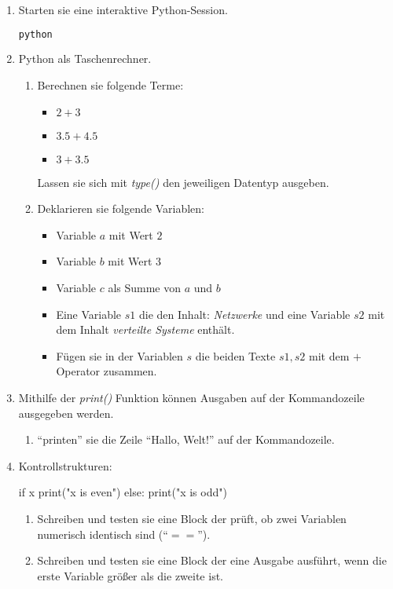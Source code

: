 \documentclass[paper=a4,fontsize=11pt]{scrartcl}%
\numberwithin{equation}{section}
\begin{document}
\begin{enumerate}
	\item Starten sie eine interaktive Python-Session.
	\begin{lstlisting}[style=Bash, language=Bash]
python
\end{lstlisting}
	\item Python als Taschenrechner.
	\begin{enumerate}
	\item Berechnen sie folgende Terme:
		\begin{itemize}
			\item $2 + 3$
			\item $3.5 + 4.5$
			\item $3 + 3.5$
		\end{itemize}
		Lassen sie sich mit \emph{type()} den jeweiligen Datentyp ausgeben.
		\item Deklarieren sie folgende Variablen:
		\begin{itemize}
			\item Variable $a$ mit Wert $2$
			\item Variable $b$ mit Wert $3$
			\item Variable $c$ als Summe von $a$ und $b$
			\item Eine Variable $s1$ die den Inhalt: \emph{Netzwerke} und eine Variable $s2$ mit dem Inhalt \emph{verteilte Systeme} enthält.
			\item Fügen sie in der Variablen $s$ die beiden Texte $s1, s2$ mit dem $+$ Operator zusammen.
		\end{itemize}
	\end{enumerate}
	\item Mithilfe der \emph{print()} Funktion können Ausgaben auf der Kommandozeile ausgegeben werden.
	\begin{enumerate}
		\item \enquote{printen} sie die Zeile \enquote{Hallo, Welt!} auf der Kommandozeile.
	\end{enumerate}
	\item Kontrollstrukturen:
	\begin{python}
if x %
	print("x is even")
else:
	print("x is odd")
\end{python}
	\begin{enumerate}
		\item Schreiben und testen sie eine Block der prüft, ob zwei Variablen numerisch identisch sind (\enquote{$==$}). 
		\item Schreiben und testen sie eine Block der eine Ausgabe ausführt, wenn die erste Variable größer als die zweite ist.

\end{enumerate}
\end{enumerate}
\end{document}
